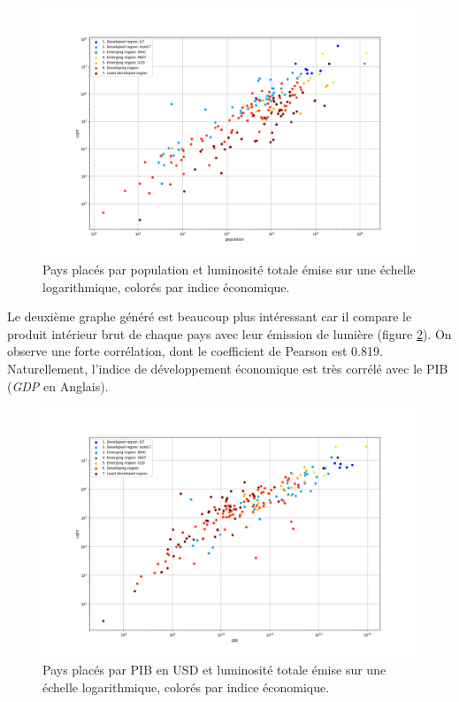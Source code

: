 \documentclass[a4paper, 11pt]{report}
\begin{document}
\begin{figure}
	\centering
	\includegraphics[width=1.0\textwidth]{img/population-light.png}
	\caption{Pays placés par population et luminosité totale émise sur une échelle logarithmique, colorés par indice économique.}
	\label{country_lightpop_scatter}
\end{figure}

Le deuxième graphe généré est beaucoup plus intéressant car il compare le produit intérieur brut de chaque pays avec leur émission de lumière (figure \ref{country_gdppop_scatter}). On observe une forte corrélation, dont le coefficient de Pearson est 0.819.
Naturellement, l'indice de développement économique est très corrélé avec le PIB (\textit{GDP} en Anglais).

\begin{figure}
	\centering
	\includegraphics[width=1.0\textwidth]{img/gdp-light.png}
	\caption{Pays placés par PIB en USD et luminosité totale émise sur une échelle logarithmique, colorés par indice économique.}
	\label{country_gdppop_scatter}
\end{figure}
\end{document}
